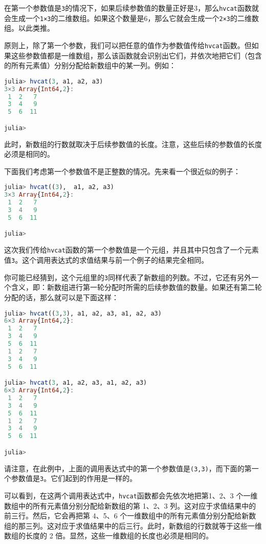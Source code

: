 在第一个参数值是\verb`3`的情况下，如果后续参数值的数量正好是3，那么\verb`hvcat`函数就会生成一个\verb`1×3`的二维数组。如果这个数量是6，那么它就会生成一个\verb`2×3`的二维数组。以此类推。

原则上，除了第一个参数，我们可以把任意的值作为参数值传给\verb`hvcat`函数。但如果这些参数值都是一维数组，那么该函数就会识别出它们，并依次地把它们（包含的所有元素值）分别分配给新数组中的某一列。例如：

\begin{lstlisting}[language=julia]
julia> hvcat(3, a1, a2, a3)
3×3 Array{Int64,2}:
 1  2   7
 3  4   9
 5  6  11

julia> 
\end{lstlisting}

此时，新数组的行数就取决于后续参数值的长度。注意，这些后续的参数值的长度必须是相同的。

下面我们考虑第一个参数值不是正整数的情况。先来看一个很近似的例子：

\begin{lstlisting}[language=julia]
julia> hvcat((3),  a1, a2, a3)
3×3 Array{Int64,2}:
 1  2   7
 3  4   9
 5  6  11

julia>
\end{lstlisting}

这次我们传给\verb`hvcat`函数的第一个参数值是一个元组，并且其中只包含了一个元素值\verb`3`。这个调用表达式的求值结果与前一个例子的结果完全相同。

你可能已经猜到，这个元组里的\verb`3`同样代表了新数组的列数。不过，它还有另外一个含义，即：新数组进行第一轮分配时所需的后续参数值的数量。如果还有第二轮分配的话，那么就可以是下面这样：

\begin{lstlisting}[language=julia]
julia> hvcat((3,3), a1, a2, a3, a1, a2, a3)
6×3 Array{Int64,2}:
 1  2   7
 3  4   9
 5  6  11
 1  2   7
 3  4   9
 5  6  11

julia> hvcat(3, a1, a2, a3, a1, a2, a3)
6×3 Array{Int64,2}:
 1  2   7
 3  4   9
 5  6  11
 1  2   7
 3  4   9
 5  6  11

julia> 
\end{lstlisting}

请注意，在此例中，上面的调用表达式中的第一个参数值是\verb`(3,3)`，而下面的第一个参数值是\verb`3`。它们起到的作用是一样的。

可以看到，在这两个调用表达式中，\verb`hvcat`函数都会先依次地把第1、2、3 个一维数组中的所有元素值分别分配给新数组的第 1、2、3 列。这对应于求值结果中的前三行。然后，它会再把第 4、5、6 个一维数组中的所有元素值分别分配给新数组的那三列。这对应于求值结果中的后三行。此时，新数组的行数就等于这些一维数组的长度的 2 倍。显然，这些一维数组的长度也必须是相同的。

